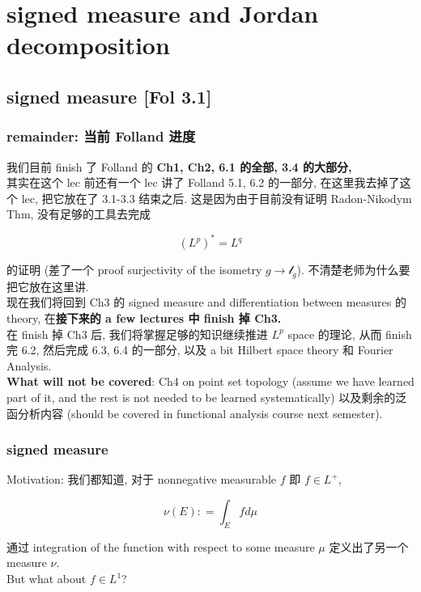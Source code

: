 \chapter{signed measure and Jordan decomposition}\label{signed-measure-and-jordan-decomposition}

\section{signed measure {[}Fol 3.1{]}}

\subsection{remainder: 当前 Folland 进度}\label{remainder-ux5f53ux524d-folland-ux8fdbux5ea6}

我们目前 finish 了 Folland 的 \textbf{Ch1, Ch2, 6.1 的全部, 3.4 的大部分,}\\
其实在这个 lec 前还有一个 lec 讲了 Folland 5.1, 6.2 的一部分, 在这里我去掉了这个 lec, 把它放在了 3.1-3.3 结束之后. 这是因为由于目前没有证明 Radon-Nikodym Thm, 没有足够的工具去完成

\[(L^{p})^{\ast} = L^{q}\]

的证明 (差了一个 proof surjectivity of the isometry \(g\rightarrow\mathcal{l}_{g}\)). 不清楚老师为什么要把它放在这里讲.\\
现在我们将回到 Ch3 的 signed measure and differentiation between measures 的 theory, 在\textbf{接下来的 a few lectures 中 finish 掉 Ch3.}\\
在 finish 掉 Ch3 后, 我们将掌握足够的知识继续推进 \(L^{p}\) space 的理论, 从而 finish 完 6.2, 然后完成 6.3, 6.4 的一部分, 以及 a bit Hilbert space theory 和 Fourier Analysis.\\
\textbf{What will not be covered}: Ch4 on point set topology (assume we have learned part of it, and the rest is not needed to be learned systematically) 以及剩余的泛函分析内容 (should be covered in functional analysis course next semester).

\subsection{signed measure}\label{signed-measure}

Motivation: 我们都知道, 对于 nonnegative measurable \(f\) 即 \(f \in L^{+}\),

\[\nu(E): = \int_{E}f d\mu\]

通过 integration of the function with respect to some measure \(\mu\) 定义出了另一个 measure \(\nu\).\\
But what about \(f \in L^{1}\)?

